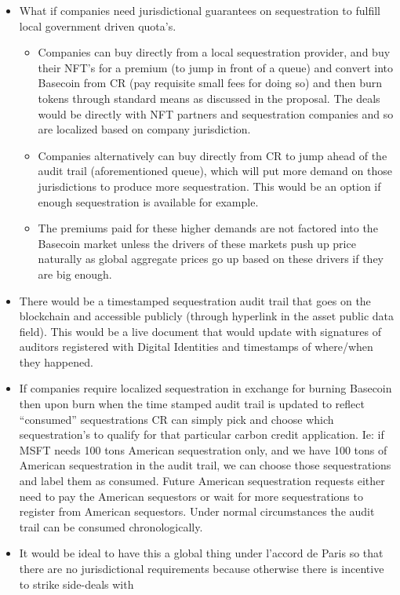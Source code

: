 \documentclass{article}
\begin{document}
\begin{itemize}
\item What if companies need jurisdictional guarantees on sequestration to fulfill local
government driven quota’s.
\begin{itemize}
\item Companies can buy directly from a local sequestration provider, and buy their
NFT’s for a premium (to jump in front of a queue) and convert into Basecoin from
CR (pay requisite small fees for doing so) and then burn tokens through standard
means as discussed in the proposal. The deals would be directly with NFT
partners and sequestration companies and so are localized based on company
jurisdiction.
\item Companies alternatively can buy directly from CR to jump ahead of the audit trail
(aforementioned queue), which will put more demand on those jurisdictions to
produce more sequestration. This would be an option if enough sequestration is
available for example.
\item The premiums paid for these higher demands are not factored into the Basecoin
market unless the drivers of these markets push up price naturally as global
aggregate prices go up based on these drivers if they are big enough.
\end{itemize}
\item There would be a timestamped sequestration audit trail that goes on the blockchain and
accessible publicly (through hyperlink in the asset public data field). This would be a live
document that would update with signatures of auditors registered with Digital Identities
and timestamps of where/when they happened.
\item If companies require localized sequestration in exchange for burning Basecoin then
upon burn when the time stamped audit trail is updated to reflect “consumed”
sequestrations CR can simply pick and choose which sequestration’s to qualify for that
particular carbon credit application. Ie: if MSFT needs 100 tons American sequestration
only, and we have 100 tons of American sequestration in the audit trail, we can choose those sequestrations and label them as consumed. Future American sequestration
requests either need to pay the American sequestors or wait for more sequestrations to
register from American sequestors. Under normal circumstances the audit trail can be
consumed chronologically.
\item It would be ideal to have this a global thing under l'accord de Paris so that there are no
jurisdictional requirements because otherwise there is incentive to strike side-deals with

\end{itemize}
\end{document}
